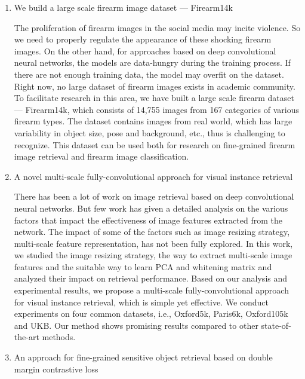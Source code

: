 \begin{enumerate}

\item We build a large scale firearm image dataset --- Firearm14k

The proliferation of firearm images in the social media may incite violence. So we need to properly regulate the appearance of these shocking firearm images. On the other hand, for approaches based on deep convolutional neural networks, the models are data-hungry during the training process. If there are not enough training data, the model may overfit on the dataset. Right now, no large dataset of firearm images exists in academic community. To facilitate research in this area, we have built a large scale firearm dataset --- Firearm14k, which consists of 14,755 images from 167 categories of various firearm types. The dataset contains images from real world, which has large variability in object size, pose and background, etc., thus is challenging to recognize. This dataset can be used both for research on fine-grained firearm image retrieval and firearm image classification.

\item A novel multi-scale fully-convolutional approach for visual instance retrieval

There has been a lot of work on image retrieval based on deep convolutional neural networks. But few work has given a detailed analysis on the various factors that impact the effectiveness of image features extracted from the network. The impact of some of the factors such as image resizing strategy, multi-scale feature representation, has not been fully explored. In this work, we studied the image resizing strategy, the way to extract multi-scale image features and the suitable way to learn PCA and whitening matrix and analyzed their impact on retrieval performance. Based on our analysis and experimental results, we propose a multi-scale fully-convolutional approach for visual instance retrieval, which is simple yet effective. We conduct experiments on four common datasets, i.e., Oxford5k, Paris6k, Oxford105k and UKB. Our method shows promising results compared to other state-of-the-art methods.

\item An approach for fine-grained sensitive object retrieval based on double margin contrastive loss


\end{enumerate}
